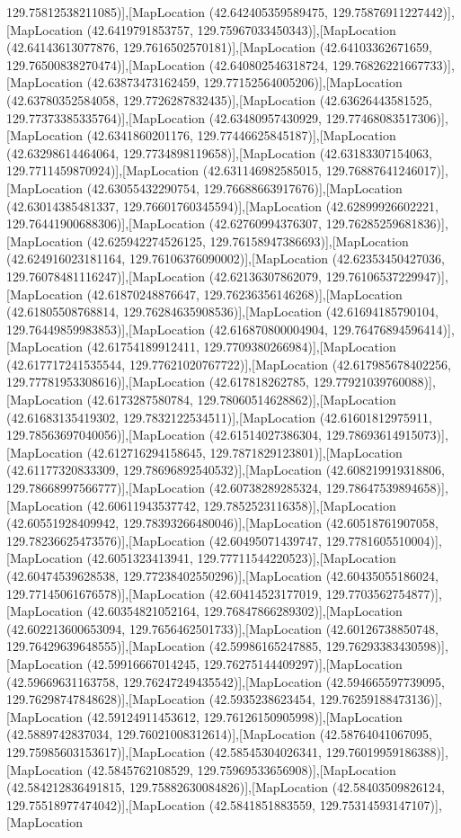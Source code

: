 129.75812538211085)],[MapLocation (42.642405359589475, 129.75876911227442)],[MapLocation (42.6419791853757, 129.75967033450343)],[MapLocation (42.64143613077876, 129.7616502570181)],[MapLocation (42.64103362671659, 129.76500838270474)],[MapLocation (42.640802546318724, 129.76826221667733)],[MapLocation (42.63873473162459, 129.77152564005206)],[MapLocation (42.63780352584058, 129.7726287832435)],[MapLocation (42.63626443581525, 129.77373385335764)],[MapLocation (42.63480957430929, 129.77468083517306)],[MapLocation (42.6341860201176, 129.77446625845187)],[MapLocation (42.63298614464064, 129.7734898119658)],[MapLocation (42.63183307154063, 129.7711459870924)],[MapLocation (42.631146982585015, 129.76887641246017)],[MapLocation (42.63055432290754, 129.76688663917676)],[MapLocation (42.63014385481337, 129.76601760345594)],[MapLocation (42.62899926602221, 129.76441900688306)],[MapLocation (42.62760994376307, 129.76285259681836)],[MapLocation (42.625942274526125, 129.76158947386693)],[MapLocation (42.624916023181164, 129.76106376090002)],[MapLocation (42.62353450427036, 129.76078481116247)],[MapLocation (42.62136307862079, 129.76106537229947)],[MapLocation (42.61870248876647, 129.76236356146268)],[MapLocation (42.61805508768814, 129.76284635908536)],[MapLocation (42.61694185790104, 129.76449859983853)],[MapLocation (42.616870800004904, 129.76476894596414)],[MapLocation (42.61754189912411, 129.7709380266984)],[MapLocation (42.617717241535544, 129.77621020767722)],[MapLocation (42.617985678402256, 129.77781953308616)],[MapLocation (42.617818262785, 129.77921039760088)],[MapLocation (42.6173287580784, 129.78060514628862)],[MapLocation (42.61683135419302, 129.7832122534511)],[MapLocation (42.61601812975911, 129.78563697040056)],[MapLocation (42.61514027386304, 129.78693614915073)],[MapLocation (42.612716294158645, 129.7871829123801)],[MapLocation (42.61177320833309, 129.78696892540532)],[MapLocation (42.608219919318806, 129.78668997566777)],[MapLocation (42.60738289285324, 129.78647539894658)],[MapLocation (42.60611943537742, 129.7852523116358)],[MapLocation (42.60551928409942, 129.78393266480046)],[MapLocation (42.60518761907058, 129.78236625473576)],[MapLocation (42.60495071439747, 129.7781605510004)],[MapLocation (42.6051323413941, 129.77711544220523)],[MapLocation (42.60474539628538, 129.77238402550296)],[MapLocation (42.60435055186024, 129.77145061676578)],[MapLocation (42.60414523177019, 129.7703562754877)],[MapLocation (42.60354821052164, 129.76847866289302)],[MapLocation (42.602213600653094, 129.7656462501733)],[MapLocation (42.60126738850748, 129.76429639648555)],[MapLocation (42.59986165247885, 129.76293383430598)],[MapLocation (42.59916667014245, 129.76275144409297)],[MapLocation (42.59669631163758, 129.76247249435542)],[MapLocation (42.594665597739095, 129.76298747848628)],[MapLocation (42.5935238623454, 129.76259188473136)],[MapLocation (42.59124911453612, 129.76126150905998)],[MapLocation (42.5889742837034, 129.76021008312614)],[MapLocation (42.58764041067095, 129.75985603153617)],[MapLocation (42.58545304026341, 129.76019959186388)],[MapLocation (42.5845762108529, 129.75969533656908)],[MapLocation (42.584212836491815, 129.75882630084826)],[MapLocation (42.58403509826124, 129.75518977474042)],[MapLocation (42.5841851883559, 129.75314593147107)],[MapLocation 